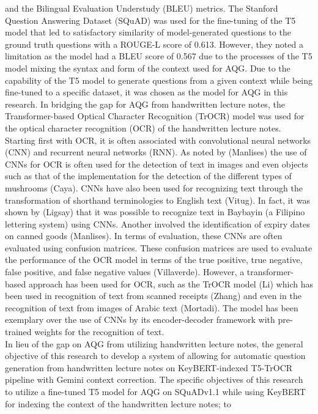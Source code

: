 \documentclass[conference]{IEEEtran}
\begin{document}
and the Bilingual Evaluation Understudy (BLEU) metrics. 
The Stanford Question Answering Dataset (SQuAD) was used for the 
fine-tuning of the T5 model that led to satisfactory similarity of model-generated
questions to the ground truth questions with a ROUGE-L score of 0.613. However,
they noted a limitation as the model had a BLEU score of 0.567 due to the processes
of the T5 model mixing the syntax and form of the context used for AQG. Due to 
the capability of the T5 model to generate questions from a given context while 
being fine-tuned to a specific dataset, it was chosen as the model for AQG in this 
research. In bridging the gap for AQG from handwritten lecture notes,
the Transformer-based Optical Character Recognition (TrOCR) model was used for the optical character recognition (OCR) of the 
handwritten lecture notes. Starting first with OCR, it is often associated with 
convolutional neural networks (CNN) and recurrent neural networks (RNN). As noted 
by (Manlises) the use of CNNs for OCR is often used for the detection of text
in images and even objects such as that of the implementation for the detection 
of the different types of mushrooms (Caya). CNNs have also been used for 
recognizing text through the transformation of shorthand terminologies to 
English text (Vitug). In fact, it was shown by (Ligsay) that it was 
possible to recognize text in Baybayin (a Filipino lettering system) 
using CNNs. Another involved the identification of expiry dates on 
canned goods (Manlises). In terms of evaluation, these CNNs are often evaluated 
using confusion matrices. These confusion matrices are used to evaluate the
performance of the OCR model in terms of the true positive, true negative, false
positive, and false negative values (Villaverde). However, a transformer-based
approach has been used for OCR, such as the TrOCR model (Li) which has been used in recognition of text from 
scanned receipts (Zhang) and even in the recognition of text from images of 
Arabic text (Mortadi). The model has been exemplary over the use of CNNs by its 
encoder-decoder framework with pre-trained weights for the recognition of text.
\\
\indent In lieu of the gap on AQG from utilizing handwritten lecture notes, 
the general objective of this research to develop a system of allowing for
automatic question generation from handwritten lecture notes on KeyBERT-indexed 
T5-TrOCR pipeline with Gemini context correction. The specific objectives of
this research to utilize a fine-tuned T5 model for AQG on SQuADv1.1 while 
using KeyBERT for indexing the context of the handwritten lecture notes; to 
\end{document}
